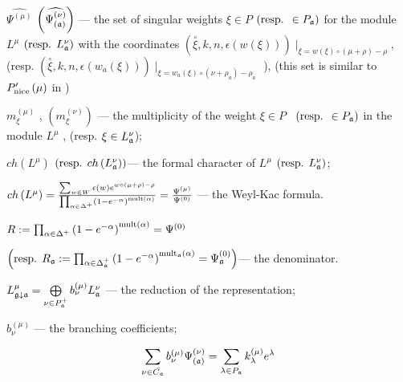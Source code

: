 \documentclass[a4paper,12pt]{article}
\theoremstyle{definition} \newtheorem{Def}{Definition}
\begin{document}
$\widehat{\Psi ^{\left( \mu \right) }}$ $\left( \widehat{\Psi _{\left( \frak{%
a}\right) }^{\left( \nu \right) }}\right) $ --- the set of singular weights $%
\xi \in P$ $\left( \text{resp. }\in P_{\frak{a}}\right) $ for the module $%
L^{\mu }$ $\left( \text{resp. }L_{\frak{a}}^{\nu }\right) $ with the
coordinates $\left( \overset{\circ }{\xi },k,n,\epsilon \left( w\left( \xi
\right) \right) \right) \mid _{\xi =w\left( \xi \right) \circ (\mu +\rho
)-\rho },$ (resp. $\left( \overset{\circ }{\xi },k,n,\epsilon \left(
w_{a}\left( \xi \right) \right) \right) \mid _{\xi =w_{a}\left( \xi \right)
\circ (\nu +\rho _{a})-\rho _{a}}$ ), (this set is similar to $P_{\mathrm{%
nice}}^{\prime }\left( \mu \right) $ in \cite{wakimoto2001idl})

$m_{\xi }^{\left( \mu \right) }$ , $\left( m_{\xi }^{\left( \nu \right)
}\right) $ --- the multiplicity of the weight $\xi \in P$ \ $\left( \text{%
resp. }\in P_{\frak{a}}\right) $ in the module $L^{\mu }$ , (resp. $\xi \in
L_{\frak{a}}^{\nu } $);

$ch\left( L^{\mu }\right) $ $\left( \text{resp. }ch\left( L_{\frak{a}}^{\nu
}\right) \right) $--- the formal character of $L^{\mu }$ $\left( \text{resp. }%
L_{\frak{a}}^{\nu }\right) $;

$ch\left( L^{\mu }\right) =\frac{\sum_{w\in W}\epsilon (w)e^{w\circ (\mu
+\rho )-\rho }}{\prod_{\alpha \in \Delta ^{+}}\left( 1-e^{-\alpha }\right) ^{%
\mathrm{{mult}\left( \alpha \right) }}}=\frac{\Psi ^{\left( \mu \right) }}{%
\Psi ^{\left( 0\right) }}$ --- the Weyl-Kac formula.

$R:=\prod_{\alpha \in \Delta ^{+}}\left( 1-e^{-\alpha }\right) ^{\mathrm{{%
mult}\left( \alpha \right) }}=\Psi ^{\left( 0\right) }\quad $

\noindent $\left( \text{resp. }R_{\frak{a}}:=\prod_{\alpha \in \Delta _{%
\frak{a}}^{+}}\left( 1-e^{-\alpha }\right) ^{\mathrm{mult}_{\frak{a}}\mathrm{%
\left( \alpha \right) }}=\Psi _{\frak{a}}^{\left( 0\right) }\right) $--- the
denominator.

$  L_{\frak{g}\downarrow \frak{a}}^{\mu }=\bigoplus\limits_{\nu \in P_{\frak{a}}^{+}}b_{\nu }^{\left( \mu \right) }L_{\frak{a}}^{\nu }$ --- the reduction of the representation;


$b^{(\mu)}_{\nu}$ --- the branching coefficients;

\begin{equation}
  \label{eq:21}
  \sum_{\nu \in \bar{C_{\mathfrak{a}}}}b_{\nu }^{\left( \mu \right) }\Psi _{\left( \frak{%
        a}\right) }^{\left( \nu \right) }=\sum_{\lambda \in P_{\frak{a}}}k_{\lambda
  }^{\left( \mu \right) }e^{\lambda }
\end{equation}
\end{document}

